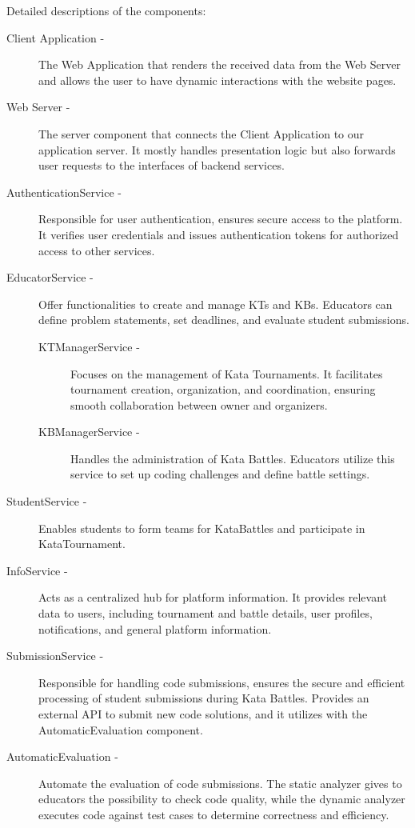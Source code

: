 \documentclass[11pt]{report}
\begin{document}
Detailed descriptions of the components:
\begin{description}
    \item[Client Application - ] The Web Application that renders the received data from the Web Server and allows the user to have 
    dynamic interactions with the website pages.
    \item[Web Server - ] The server component that connects the Client Application to our application server.
    It mostly handles presentation logic but also forwards user requests to the interfaces of backend services.
    \item[AuthenticationService - ] Responsible for user authentication,  ensures secure access to the platform.
    It verifies user credentials and issues authentication tokens for authorized access to other services.
    \item[EducatorService - ] Offer functionalities to create and manage KTs and KBs.
    Educators can define problem statements, set deadlines, and evaluate student submissions.
    \begin{description}
        \item[KTManagerService - ]  Focuses on the management of Kata Tournaments.
        It facilitates tournament creation, organization, and coordination, ensuring smooth collaboration between owner and organizers.
        \item[KBManagerService - ] Handles the administration of Kata Battles.
        Educators utilize this service to set up coding challenges and define battle settings.
    \end{description}
    \item[StudentService - ] Enables students to form teams for KataBattles and participate in KataTournament.
    \item[InfoService - ] Acts as a centralized hub for platform information.
    It provides relevant data to users, including tournament and battle details, user profiles, notifications, and general platform information.
    \item[SubmissionService - ] Responsible for handling code submissions, ensures the secure and efficient processing of student submissions during Kata Battles.
    Provides an external API to submit new code solutions, and it utilizes with the AutomaticEvaluation component.
    \item[AutomaticEvaluation - ] Automate the evaluation of code submissions.
    The static analyzer gives to educators the possibility to check code quality, while the dynamic analyzer executes code against test cases to determine correctness and efficiency.

\end{description}
\end{document}
